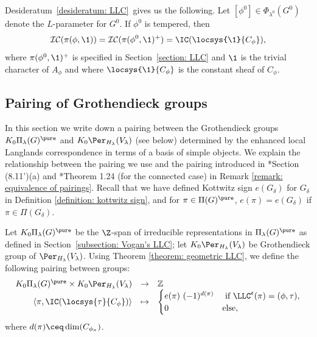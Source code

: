 \documentclass[11pt,letterpaper]{amsart}
\numberwithin{equation}{section}
\begin{document}
\begin{remark}\label{Remark: Fixing where the tempered rep goes wrt whittaker normalization}
    Desideratum~\ref{desideratum: LLC}\Sha\ gives us the following. Let $[\phi^0]\in \Phi_{\lambda^0}(G^0)$ denote the $L$-parameter for $G^0$. If $\phi^0$ is tempered, then 
    \[
    \mathcal{IC}(\pi(\phi,\1))= \mathcal{IC}(\pi(\phi^0,\1)^+)=\IC(\locsys{\1}{C_\phi}),
    \]
    where $\pi(\phi^0,\1)^+$ is specified in Section~\ref{section: LLC} and $\1$ is the trivial character of $A_\phi$ and where $\locsys{\1}{C_\phi}$ is the constant sheaf of $C_\phi$.
\end{remark}




\subsection{Pairing of Grothendieck groups}\label{subsection: pairing}


In this section we write down a pairing between the Grothendieck groups $K_0\Pi_\lambda(G)^\pure$ and $K_0\Per_{H_\lambda}(V_\lambda)$ (see below) determined by the enhanced local Langlands correspondence in terms of a basis of simple objects. 
We explain the relationship between the pairing we use and the pairing introduced in \cite{Vog93}*{Section (8.11')(a)} and \cite{ABV92}*{Theorem 1.24} (for the connected case) in Remark \ref{remark: equivalence of pairings}.
Recall that we have defined Kottwitz sign $e(G_{\delta})$ for $G_{\delta}$ in Definition \ref{definition: kottwitz sign}, and for $\pi \in \Pi(G)^\pure$, $e(\pi)= e(G_{\delta})$ if $\pi \in \Pi(G_{\delta})$. 

\begin{definition}\label{definition: pairing}
Let $K_0\Pi_\lambda(G)^\pure$ be the $\Z$-span of irreducible representations in $\Pi_\lambda(G)^\pure$ as defined in Section~\ref{subsection: Vogan's LLC}; let $K_0\Per_{H_\lambda}(V_\lambda)$ be Grothendieck group of $\Per_{H_\lambda}(V_\lambda)$. Using Theorem \ref{theorem: geometric LLC}, we define the following pairing between groups:
\begin{equation}\label{equation: pairing}
    \begin{array}{rcl}
        K_0\Pi_\lambda(G)^\pure \times K_0\Per_{H_\lambda}(V_\lambda)
            &\to& \mathbb{Z}\\
        \langle \pi, \IC(\locsys{\tau}{C_\phi}) \rangle 
            &\mapsto& 
            \begin{cases}
                e(\pi)\ (-1)^{d(\pi)} & \text{ if }\LLC^\mathfrak{e}(\pi) = (\phi,\tau), \\
                0 & \text{else},
            \end{cases}
    \end{array}
\end{equation}
where $d(\pi) \ceq \dim (C_{\phi_\pi})$.
\end{definition}
\end{document}
